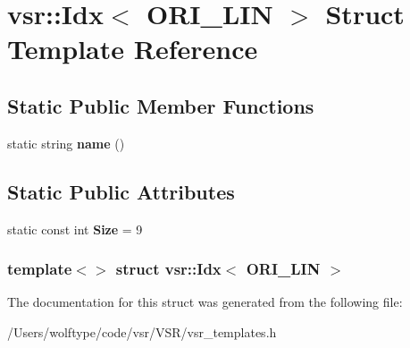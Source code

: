 \hypertarget{structvsr_1_1_idx_3_01_o_r_i___l_i_n_01_4}{\section{vsr\-:\-:Idx$<$ O\-R\-I\-\_\-\-L\-I\-N $>$ Struct Template Reference}
\label{structvsr_1_1_idx_3_01_o_r_i___l_i_n_01_4}
}
\subsection*{Static Public Member Functions}
\begin{DoxyCompactItemize}
\item 
\hypertarget{structvsr_1_1_idx_3_01_o_r_i___l_i_n_01_4_aa1fa78974e0ba69abe2a6b4879d64b69}{static string {\bfseries name} ()}\label{structvsr_1_1_idx_3_01_o_r_i___l_i_n_01_4_aa1fa78974e0ba69abe2a6b4879d64b69}

\end{DoxyCompactItemize}
\subsection*{Static Public Attributes}
\begin{DoxyCompactItemize}
\item 
\hypertarget{structvsr_1_1_idx_3_01_o_r_i___l_i_n_01_4_a88bcfd82ee300ba7d210989bffba3d76}{static const int {\bfseries Size} = 9}\label{structvsr_1_1_idx_3_01_o_r_i___l_i_n_01_4_a88bcfd82ee300ba7d210989bffba3d76}

\end{DoxyCompactItemize}
\subsubsection*{template$<$$>$ struct vsr\-::\-Idx$<$ O\-R\-I\-\_\-\-L\-I\-N $>$}



The documentation for this struct was generated from the following file\-:\begin{DoxyCompactItemize}
\item 
/\-Users/wolftype/code/vsr/\-V\-S\-R/vsr\-\_\-templates.\-h\end{DoxyCompactItemize}
